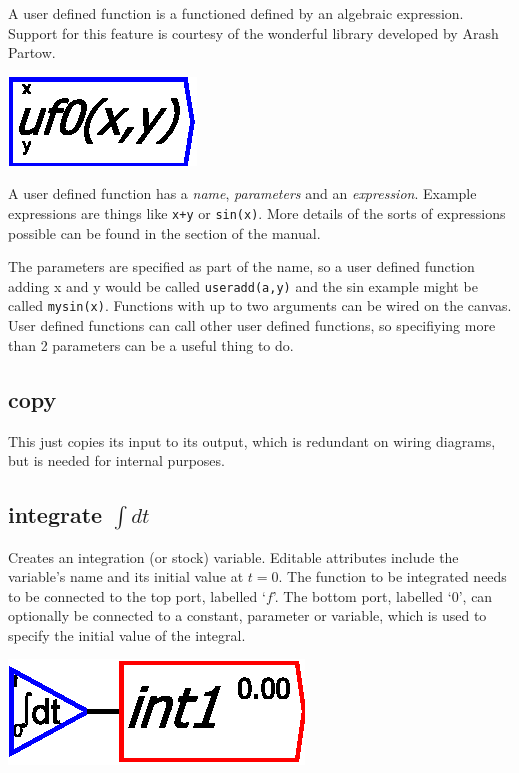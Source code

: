 \label{Operation:userFunction}\label{UserFunction}

A user defined function is a functioned defined by an algebraic expression.
Support for this feature is courtesy of the wonderful 
library developed by Arash Partow.

\includegraphics{images/userFunction}

A user defined function has a {\em name}, {\em parameters} and
an {\em expression}. Example expressions are things like \verb'x+y'
or \verb'sin(x)'. More details of the sorts of expressions possible
can be found in the 
section of the manual.

The parameters are specified as part of the name, so a user defined
function adding x and y would be called \verb'useradd(a,y)' and the
sin example might be called \verb'mysin(x)'. Functions with up to
two arguments can be wired on the canvas. User defined functions can
call other user defined functions, so specifiying more than 2 parameters
can be a useful thing to do.

\subsection{copy}

\label{Operation:copy} This just copies its input to its output,
which is redundant on wiring diagrams, but is needed for internal
purposes.

\subsection{integrate $\int dt$}

\label{IntOp} Creates an integration (or stock) variable. Editable
attributes include the variable's name and its initial value at $t=0$.
The function to be integrated needs to be connected to the top port,
labelled `$f$'. The bottom port, labelled `0', can optionally be
connected to a constant, parameter or variable, which is used to specify
the initial value of the integral.

\includegraphics{images/integral}

